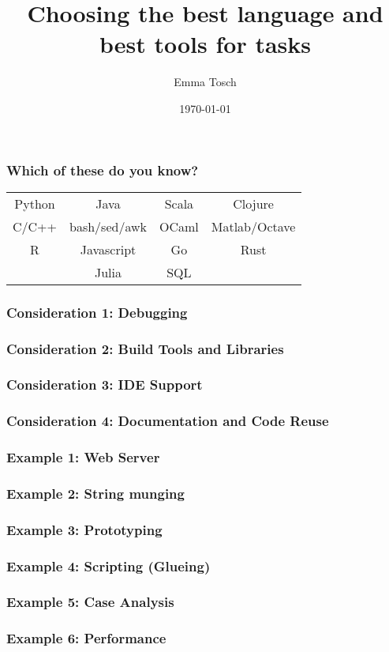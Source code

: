 \documentclass{beamer}
\title{Choosing the best language and best tools for tasks}
\author{Emma Tosch}
\institute{CS Women NCWIT Symantec Workshops}
\date{\today}
\begin{document}
\begin{frame}
  \titlepage
\end{frame}

\begin{frame}
  \frametitle{Which of these do you know?}
  \begin{center}
    \setlength{\tabcolsep}{12pt}
    \renewcommand{\arraystretch}{2}
    \begin{tabular}{*{4}{|c|}}
      \hline
      Python & Java & Scala & Clojure \\
      C/C++ & bash/sed/awk & OCaml & Matlab/Octave \\
      R & Javascript & Go & Rust \\
      & Julia & SQL & \\
      \hline
    \end{tabular}
  \end{center}
\end{frame}

\begin{frame}
  \frametitle{Consideration 1: Debugging}
\end{frame}

\begin{frame}
  \frametitle{Consideration 2: Build Tools and Libraries}
\end{frame}

\begin{frame}
  \frametitle{Consideration 3: IDE Support}
\end{frame}

\begin{frame}
  \frametitle{Consideration 4: Documentation and Code Reuse}
\end{frame}

\begin{frame}
  \frametitle{Example 1: Web Server}
\end{frame}

\begin{frame}
  \frametitle{Example 2: String munging}
\end{frame}

\begin{frame}
  \frametitle{Example 3: Prototyping}
\end{frame}

\begin{frame}
  \frametitle{Example 4: Scripting (Glueing)}
\end{frame}

\begin{frame}
  \frametitle{Example 5: Case Analysis}
\end{frame}

\begin{frame}
  \frametitle{Example 6: Performance}
\end{frame}
\end{document}
